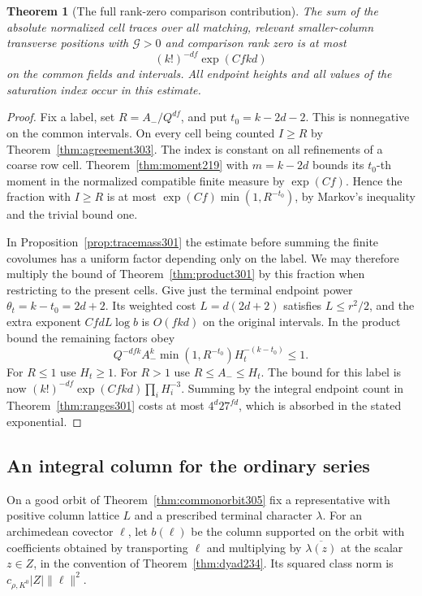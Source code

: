 \documentclass[a4paper,11pt]{article}
\newtheorem{theorem}[proposition]{Theorem}
\theoremstyle{definition}
\theoremstyle{remark}
\numberwithin{equation}{section}
\begin{document}
\begin{theorem}[The full rank-zero comparison contribution]\leavevmode
\label{thm:zerotrace303}
The sum of the absolute normalized cell traces over all
matching, relevant smaller-column transverse positions
with \(\mathcal G>0\) and comparison rank zero is at most
\[
                         (k!)^{-df}\exp(Cfkd)
\]
on the common fields and intervals. All endpoint heights
and all values of the saturation index occur in this estimate.
\end{theorem}
\begin{proof}
Fix a label, set \(R=A_-/Q^{df}\), and put \(t_0=k-2d-2\).
This is nonnegative on the common intervals. On every cell
being counted \(I\ge R\) by Theorem~\ref{thm:agreement303}.
The index is constant on all refinements of a coarse row
cell. Theorem~\ref{thm:moment219} with \(m=k-2d\) bounds
its \(t_0\)-th moment in the normalized compatible finite
measure by \(\exp(Cf)\). Hence the fraction with \(I\ge R\)
is at most \(\exp(Cf)\min(1,R^{-t_0})\), by Markov's
inequality and the trivial bound one.

In Proposition~\ref{prop:tracemass301} the estimate before
summing the finite covolumes has a uniform factor depending
only on the label. We may therefore multiply the bound of
Theorem~\ref{thm:product301} by this fraction when restricting
to the present cells. Give just the terminal endpoint power
\(\theta_t=k-t_0=2d+2\). Its weighted cost
\(L=d(2d+2)\) satisfies \(L\le r^2/2\), and the extra
exponent \(CfdL\log b\) is \(O(fkd)\) on the original intervals.
In the product bound the remaining factors obey
\[
     Q^{-dfk}A_-^k\min(1,R^{-t_0})H_t^{-(k-t_0)}
                    \le1 .
\]
For \(R\le1\) use \(H_t\ge1\). For \(R>1\) use
\(R\le A_-\le H_t\). The bound for this label is now
\((k!)^{-df}\exp(Cfkd)\prod_i H_i^{-3}\).
Summing by the integral endpoint count in
Theorem~\ref{thm:ranges301} costs at most \(4^d27^{fd}\),
which is absorbed in the stated exponential.
\end{proof}

\subsection{An integral column for the ordinary series}\label{nav:III-67}
On a good orbit of Theorem~\ref{thm:commonorbit305} fix a
representative with positive column lattice \(L\) and a
prescribed terminal character \(\lambda\). For an archimedean
covector \(\ell\), let \(b(\ell)\) be the column supported
on the orbit with coefficients obtained by transporting
\(\ell\) and multiplying by \(\overline{\lambda(z)}\) at
the scalar \(z\in Z\), in the convention of
Theorem~\ref{thm:dyad234}. Its squared class norm is
\(c_{\rho,K^0}|Z|\|\ell\|^2\).
\end{document}
